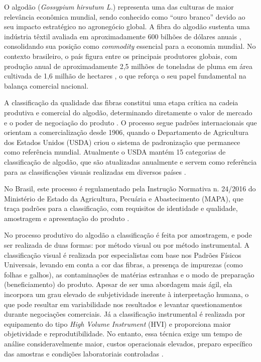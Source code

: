 
O algodão (\textit{Gossypium hirsutum L.}) representa uma das culturas de maior relevância econômica mundial, sendo conhecido como ``ouro branco'' devido ao seu impacto estratégico no agronegócio global. A fibra do algodão sustenta uma indústria têxtil avaliada em aproximadamente 600 bilhões de dólares anuais \cite{Khan2020}, consolidando sua posição como \textit{commodity} essencial para a economia mundial. No contexto brasileiro, o país figura entre os principais produtores globais, com produção anual de aproximadamente 2,5 milhões de toneladas de pluma em área cultivada de 1,6 milhão de hectares \cite{conab2024}, o que reforça o seu papel fundamental na balança comercial nacional.

A classificação da qualidade das fibras constitui uma etapa crítica na cadeia produtiva e comercial do algodão, determinando diretamente o valor de mercado e o poder de negociação do produto \cite{yasar2021quality}. O processo segue padrões internacionais que orientam a comercialização desde 1906, quando o Departamento de Agricultura dos Estados Unidos (USDA) criou o sistema de padronização que permanece como referência mundial. Atualmente o USDA mantém 15 categorias de classificação de algodão, que são atualizadas anualmente e servem como referência para as classificações visuais realizadas em diversos países \cite{cottoninc2017}.

No Brasil, este processo é regulamentado pela Instrução Normativa n. 24/2016 do Ministério de Estado da Agricultura, Pecuária e Abastecimento (MAPA), que traça padrões para a classificação, com requisitos de identidade e qualidade, amostragem e apresentação do produto \cite{mapa2016}.

No processo produtivo do algodão a classificação é feita por amostragem, e pode ser realizada de duas formas: por método visual ou por método instrumental. A classificação visual é realizada por especialistas com base nos Padrões Físicos Universais, levando em conta a cor das fibras, a presença de impurezas (como folhas e galhos), as contaminações de matérias estranhas e o modo de preparação (beneficiamento) do produto. Apesar de ser uma abordagem mais ágil, ela incorpora um grau elevado de subjetividade inerente à interpretação humana, o que pode resultar em variabilidade nos resultados e levantar questionamentos durante negociações comerciais. Já a classificação instrumental é realizada por equipamento do tipo \textit{High Volume Instrument} (HVI) e proporciona maior objetividade e reprodutibilidade. No entanto, essa técnica exige um tempo de análise consideravelmente maior, custos operacionais elevados, preparo específico das amostras e condições laboratoriais controladas \cite{Oliveira2022} \cite{mapa2016}.

